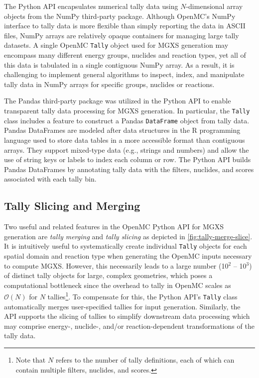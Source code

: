 The Python API encapsulates numerical tally data using $N$-dimensional array objects from the NumPy third-party package\cite{walt2011numpy}. Although OpenMC's NumPy interface to tally data is more flexible than simply reporting the data in ASCII files, NumPy arrays are relatively opaque containers for managing large tally datasets. A single OpenMC \texttt{Tally} object used for MGXS generation may encompass many different energy groups, nuclides and reaction types, yet all of this data is tabulated in a single contiguous NumPy array. As a result, it is challenging to implement general algorithms to inspect, index, and manipulate tally data in NumPy arrays for specific groups, nuclides or reactions.

The Pandas third-party package\cite{mckinney2010pandas} was utilized in the Python API to enable transparent tally data processing for MGXS generation. In particular, the \texttt{Tally} class includes a feature to construct a Pandas \texttt{DataFrame} object from tally data. Pandas DataFrames are modeled after data structures in the \textsf{R} programming language used to store data tables in a more accessible format than contiguous arrays. They support mixed-type data (e.g., strings and numbers) and allow the use of string keys or labels to index each column or row. The Python API builds Pandas DataFrames by annotating tally data with the filters, nuclides, and scores associated with each tally bin.

\subsection{Tally Slicing and Merging}
\label{subsec:tally-slice-merge}

Two useful and related features in the OpenMC Python API for MGXS generation are \emph{tally merging} and \emph{tally slicing} as depicted in \cref{fig:tally-merge-slice}. It is intuitively useful to systematically create individual \texttt{Tally} objects for each spatial domain and reaction type when generating the OpenMC inputs necessary to compute MGXS. However, this necessarily leads to a large number (10$^2$ -- 10$^3$) of distinct tally objects for large, complex geometries, which poses a computational bottleneck since the overhead to tally in OpenMC scales as $\mathcal{O}(N)$ for $N$ tallies\footnote{Note that $N$ refers to the number of tally definitions, each of which can contain multiple filters, nuclides, and scores.}. To compensate for this, the Python API's \texttt{Tally} class automatically merges user-specified tallies for input generation. Similarly, the API supports the slicing of tallies to simplify downstream data processing which may comprise energy-, nuclide-, and/or reaction-dependent transformations of the tally data.

